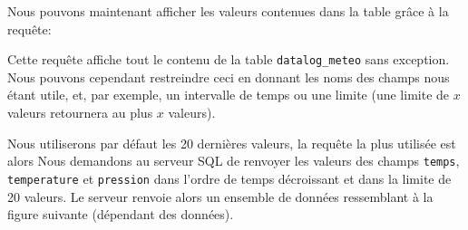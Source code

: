 Nous pouvons maintenant afficher les valeurs contenues dans la table grâce à la requête:

Cette requête affiche tout le contenu de la table \verb-datalog_meteo- sans exception. Nous pouvons cependant restreindre ceci en donnant les noms des champs nous étant utile, et, par exemple, un intervalle de temps ou une limite (une limite de $x$ valeurs retournera au plus $x$ valeurs).

Nous utiliserons par défaut les 20 dernières valeurs, la requête la plus utilisée est alors 
Nous demandons au serveur SQL de renvoyer les valeurs des champs \verb-temps-, \verb-temperature- et \verb-pression- dans l'ordre de temps décroissant et dans la limite de 20 valeurs. Le serveur renvoie alors un ensemble de données ressemblant à la figure suivante (dépendant des données).

